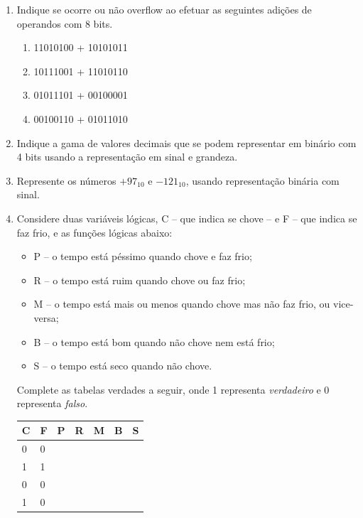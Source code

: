 \documentclass[12pt,onepage,a4paper]{memoir}
\begin{document}
\begin{enumerate}
    \item Indique se ocorre ou não overflow ao efetuar as seguintes adições de operandos com 8 bits.
        \begin{enumerate}
            \item 11010100 + 10101011
            \item 10111001 + 11010110
            \item 01011101 + 00100001
            \item 00100110 + 01011010
        \end{enumerate}

    \item Indique a gama de valores decimais que se podem representar em binário com 4 bits usando a representação em sinal e grandeza.

    \item Represente os números $+97_{10} $  e  $ -121_{10}$, usando representação binária com sinal.

    \item Considere duas variáveis lógicas, C – que indica se chove – e F – que indica se faz frio, e as funções lógicas abaixo:
    \begin{itemize}
        \item P – o tempo está péssimo quando chove e faz frio;
        \item R – o tempo está ruim quando chove ou faz frio;
        \item M – o tempo está mais ou menos quando chove mas não faz frio, ou vice-versa;
        \item B – o tempo está bom quando não chove nem está frio;
        \item S – o tempo está seco quando não chove.
    \end{itemize}

    Complete as tabelas verdades a seguir, onde 1 representa \textit{verdadeiro} e 0 representa \textit{falso}.

    \begin{table}[H]
    \centering
\begin{tabular}{|ll|l|l|l|l|l|}
\hline
C & F & P & R & M & B & S \\ \hline
0 & 0 &   &   &   &   &   \\ \cline{3-7} 
1 & 1 &   &   &   &   &   \\ \cline{3-7} 
0 & 0 &   &   &   &   &   \\ \cline{3-7} 
1 & 0 &   &   &   &   &   \\ \hline
\end{tabular}
\end{table}


\end{enumerate}
\end{document}
